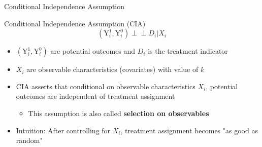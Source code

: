 \documentclass[hyperref={pdfpagelabels=false}]{beamer}
\newcommand{\indep}{\perp\!\!\!\perp}
\begin{document}
\begin{frame}{Conditional Independence Assumption}
	\begin{block}{Conditional Independence Assumption (CIA)}
		\begin{equation*}
			(\mathrm{Y}^{1}_{i},\mathrm{Y}^{0}_{i})\indep D_{i}|X_{i}
		\end{equation*}
	\end{block}
	\begin{itemize}
		\item $(\mathrm{Y}^{1}_{i},\mathrm{Y}^{0}_{i})$ are potential outcomes and $D_{i}$ is the treatment indicator
		\vspace{0.2cm} 
		\item $X_{i}$ are observable characteristics (covariates) with value of $k$
		\vspace{0.2cm} 
		\item CIA asserts that conditional on observable characteristics $X_{i}$, potential outcomes are independent of treatment assignment
		\vspace{0.2cm}
		\begin{itemize}
			\item This assumption is also called \textbf{selection on observables}
		\end{itemize}
		\vspace{0.2cm}
		\item Intuition: After controlling for $X_{i}$, treatment assignment becomes "as good as random"
	\end{itemize}
\end{frame}
\end{document}
